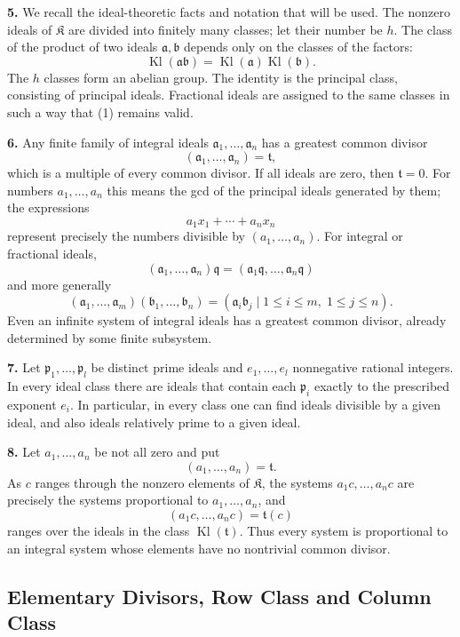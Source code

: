 \documentclass[11pt,a4paper]{article}
\newcommand{\K}{\mathfrak K}
\newcommand{\Kl}{\operatorname{Kl}}
\begin{document}
\textbf{5.} We recall the ideal-theoretic facts and notation that will be used. The nonzero ideals of \(\K\) are divided into finitely many classes; let their number be \(h\). The class of the product of two ideals \(\mathfrak a,\mathfrak b\) depends only on the classes of the factors:
\[
 \Kl(\mathfrak a\mathfrak b)=\Kl(\mathfrak a)\Kl(\mathfrak b). \tag{1}
\]
The \(h\) classes form an abelian group. The identity is the principal class, consisting of principal ideals. Fractional ideals are assigned to the same classes in such a way that (1) remains valid.

\textbf{6.} Any finite family of integral ideals \(\mathfrak a_1,\ldots,\mathfrak a_n\) has a greatest common divisor
\[
 (\mathfrak a_1,\ldots,\mathfrak a_n)=\mathfrak t,
\]
which is a multiple of every common divisor. If all ideals are zero, then \(\mathfrak t=0\). For numbers \(a_1,\ldots,a_n\) this means the gcd of the principal ideals generated by them; the expressions
\[
 a_1x_1+\cdots+a_nx_n
\]
represent precisely the numbers divisible by \((a_1,\ldots,a_n)\). For integral or fractional ideals,
\[
 (\mathfrak a_1,\ldots,\mathfrak a_n)\mathfrak q
   =(\mathfrak a_1\mathfrak q,\ldots,\mathfrak a_n\mathfrak q) \tag{2}
\]
and more generally
\[
 (\mathfrak a_1,\ldots,\mathfrak a_m)(\mathfrak b_1,\ldots,\mathfrak b_n)
 =(\mathfrak a_i\mathfrak b_j\mid 1\leq i\leq m,\;1\leq j\leq n). \tag{3}
\]
Even an infinite system of integral ideals has a greatest common divisor, already determined by some finite subsystem.

\textbf{7.} Let \(\mathfrak p_1,\ldots,\mathfrak p_l\) be distinct prime ideals and \(e_1,\ldots,e_l\) nonnegative rational integers. In every ideal class there are ideals that contain each \(\mathfrak p_i\) exactly to the prescribed exponent \(e_i\). In particular, in every class one can find ideals divisible by a given ideal, and also ideals relatively prime to a given ideal.

\textbf{8.} Let \(a_1,\ldots,a_n\) be not all zero and put
\[
 (a_1,\ldots,a_n)=\mathfrak t.
\]
As \(c\) ranges through the nonzero elements of \(\K\), the systems \(a_1c,\ldots,a_nc\) are precisely the systems proportional to \(a_1,\ldots,a_n\), and
\[
 (a_1c,\ldots,a_nc)=\mathfrak t(c)
\]
ranges over the ideals in the class \(\Kl(\mathfrak t)\). Thus every system is proportional to an integral system whose elements have no nontrivial common divisor.

\subsection*{Elementary Divisors, Row Class and Column Class}
\end{document}
